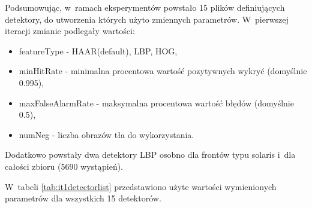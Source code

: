 Podsumowując, w~ramach
eksperymentów powstało 15 plików definiujących detektory, do utworzenia
których użyto zmiennych parametrów. W~pierwszej iteracji zmianie podlegały
wartości:

\begin{itemize}
\item featureType - HAAR(default), LBP, HOG,
\item minHitRate - minimalna procentowa wartość pozytywnych wykryć (domyślnie 0.995),
\item maxFalseAlarmRate - maksymalna procentowa wartość błędów (domyślnie 0.5),
\item numNeg - liczba obrazów tła do wykorzystania.
\end{itemize}

Dodatkowo powstały dwa detektory LBP osobno dla frontów typu solaris i~dla
całości zbioru (5690 wystąpień). 

W~tabeli \ref{tab:it1detectorlist} przedstawiono użyte wartości
wymienionych parametrów dla wszystkich 15 detektorów.

